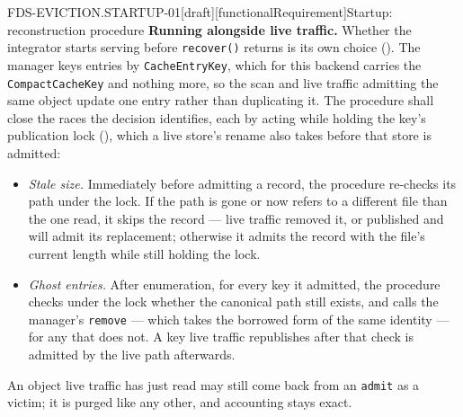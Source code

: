 \begin{requirement}{FDS-EVICTION.STARTUP-01}[draft][functionalRequirement]{Startup: reconstruction procedure}
  \textbf{Running alongside live traffic.} Whether the integrator starts
  serving before \texttt{recover()} returns is its own choice
  (). The manager keys entries by
  \texttt{CacheEntryKey}, which for this backend carries the
  \texttt{CompactCacheKey} and nothing more, so the scan and live traffic
  admitting the same object update one entry rather than duplicating it. The procedure shall
  close the races the decision identifies, each by acting while holding the
  key's publication lock (), which a live
  store's rename also takes before that store is admitted:
  \begin{itemize}
    \item \emph{Stale size.} Immediately before admitting a record, the
      procedure re-checks its path under the lock. If the path is gone or
      now refers to a different file than the one read, it skips the record
      --- live traffic removed it, or published and will admit its
      replacement; otherwise it admits the record with the file's current
      length while still holding the lock.
    \item \emph{Ghost entries.} After enumeration, for every key it admitted,
      the procedure checks under the lock whether the canonical path still
      exists, and calls the manager's \texttt{remove} --- which takes the
      borrowed 
      form of the same identity --- for any that does not.
      A key live traffic republishes after that check is admitted by the live
      path afterwards.
  \end{itemize}
  An object live traffic has just read may still come back from an
  \texttt{admit} as a victim; it is purged like any other, and accounting
  stays exact.


\end{requirement}
